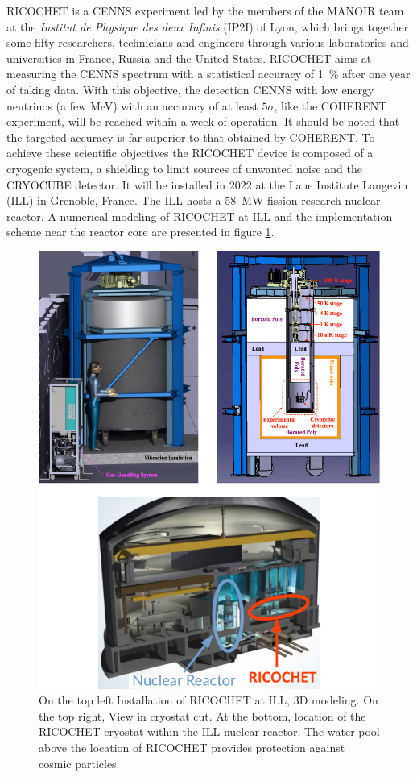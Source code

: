 RICOCHET is a CENNS experiment led by the members of the MANOIR team at the \textit{Institut de Physique des deux Infinis} (IP2I) of Lyon, which brings together some fifty researchers, technicians and engineers through various laboratories and universities in France, Russia and the United States. RICOCHET aims at measuring the CENNS spectrum with a statistical accuracy of \SI{1}{\percent} after one year of taking data. With this objective, the detection CENNS with low energy neutrinos (a few \si{\mega\eV}) with an accuracy of at least $5\sigma$, like the COHERENT experiment, will be reached within a week of operation. 
It should be noted that the targeted accuracy is far superior to that obtained by COHERENT. To achieve these scientific objectives the RICOCHET device is composed of a cryogenic system, a shielding to limit sources of unwanted noise and the CRYOCUBE detector. It will be installed in 2022 at the Laue Institute Langevin (ILL) in Grenoble, France. The ILL hosts a \SI{58}{\mega\watt} fission research nuclear reactor. A numerical modeling of RICOCHET at ILL and the implementation scheme near the reactor core are presented in figure \ref{fig:ricochet-ill-site}.

\begin{figure}
\centering
\includegraphics[scale=1]{Figures/Introduction/ricochet_ill_site.pdf}
\caption{On the top left Installation of RICOCHET at ILL, 3D modeling. On the top right, View in
cryostat cut. At the bottom, location of the RICOCHET cryostat within the ILL nuclear reactor. The water pool above the location of RICOCHET provides protection against cosmic particles.}
\label{fig:ricochet-ill-site}
\end{figure}

